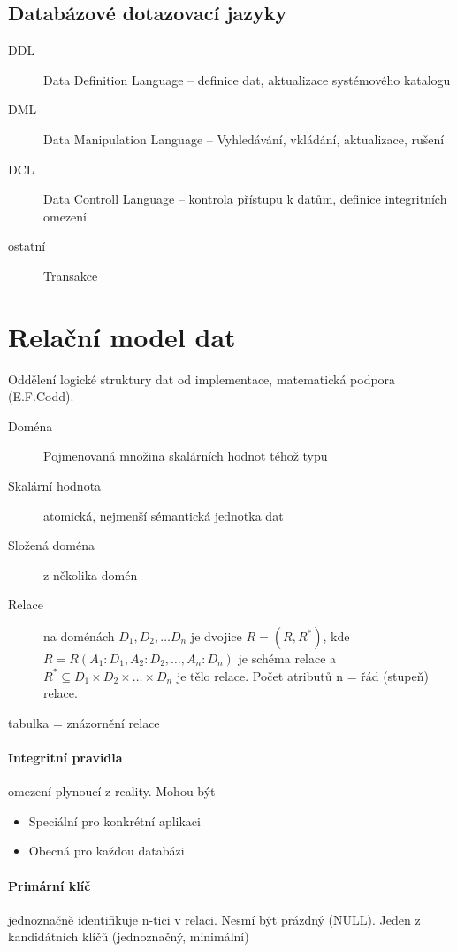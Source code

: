 \documentclass[a4paper, 11pt]{report}
\begin{document}
\subsection{Databázové dotazovací jazyky}

\begin{description}
	\item[DDL] Data Definition Language -- definice dat, aktualizace systémového katalogu
	\item[DML] Data Manipulation Language -- Vyhledávání, vkládání, aktualizace, rušení
	\item[DCL] Data Controll Language -- kontrola přístupu k datům, definice integritních omezení
	\item[ostatní] Transakce
\end{description}

\section{Relační model dat}
Oddělení logické struktury dat od implementace, matematická podpora (E.F.Codd).

\begin{description}
	\item[Doména] Pojmenovaná množina skalárních hodnot téhož typu
	\item[Skalární hodnota] atomická, nejmenší sémantická jednotka dat
	\item[Složená doména] z několika domén
	\item[Relace] na doménách $D_1, D_2, \dots D_n$ je dvojice $R = (R, R^*)$, kde $R = R(A_1:D_1, A_2:D_2, \dots, A_n:D_n)$ je schéma relace a $R^* \subseteq D_1 \times D_2 \times \dots \times D_n$ je tělo relace. Počet atributů n = řád (stupeň) relace.
\end{description}

tabulka = znázornění relace

\paragraph{Integritní pravidla} omezení plynoucí z reality. Mohou být
\begin{itemize}
	\item Speciální pro konkrétní aplikaci
	\item Obecná pro každou databázi
\end{itemize}

\paragraph{Primární klíč} jednoznačně identifikuje n-tici v relaci. Nesmí být prázdný (NULL). Jeden z kandidátních klíčů (jednoznačný, minimální)
\end{document}
